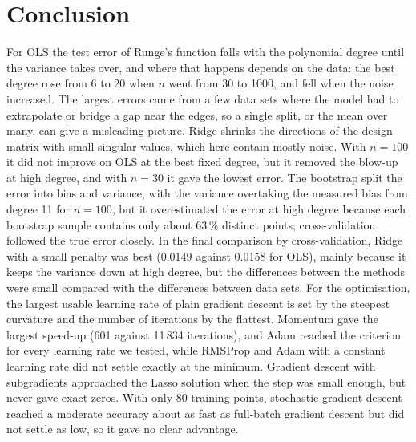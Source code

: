 
\section{Conclusion}\label{sec:conclusion}

For OLS the test error of Runge's function falls with the polynomial degree until the variance takes over, and where that happens depends on the data: the best degree rose from 6 to 20 when $n$ went from 30 to 1000, and fell when the noise increased. The largest errors came from a few data sets where the model had to extrapolate or bridge a gap near the edges, so a single split, or the mean over many, can give a misleading picture. Ridge shrinks the directions of the design matrix with small singular values, which here contain mostly noise. With $n = 100$ it did not improve on OLS at the best fixed degree, but it removed the blow-up at high degree, and with $n = 30$ it gave the lowest error. The bootstrap split the error into bias and variance, with the variance overtaking the measured bias from degree 11 for $n = 100$, but it overestimated the error at high degree because each bootstrap sample contains only about 63\,\% distinct points; cross-validation followed the true error closely. In the final comparison by cross-validation, Ridge with a small penalty was best (0.0149 against 0.0158 for OLS), mainly because it keeps the variance down at high degree, but the differences between the methods were small compared with the differences between data sets. For the optimisation, the largest usable learning rate of plain gradient descent is set by the steepest curvature and the number of iterations by the flattest. Momentum gave the largest speed-up (601 against 11\,834 iterations), and Adam reached the criterion for every learning rate we tested, while RMSProp and Adam with a constant learning rate did not settle exactly at the minimum. Gradient descent with subgradients approached the Lasso solution when the step was small enough, but never gave exact zeros. With only 80 training points, stochastic gradient descent reached a moderate accuracy about as fast as full-batch gradient descent but did not settle as low, so it gave no clear advantage.

